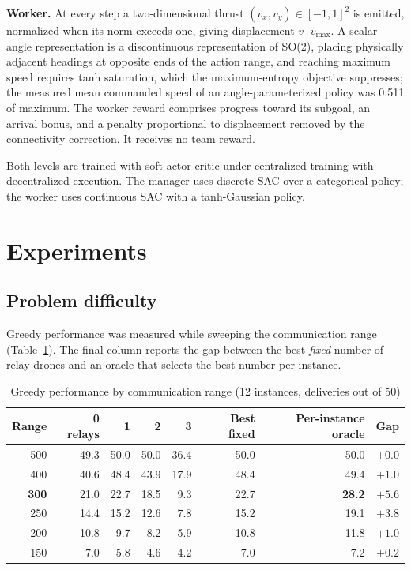 \documentclass[12pt]{article}
\begin{document}
\textbf{Worker.} At every step a two-dimensional thrust $(v_x, v_y) \in [-1,1]^2$ is emitted,
normalized when its norm exceeds one, giving displacement $v \cdot v_{\max}$. A scalar-angle
representation is a discontinuous representation of SO(2), placing physically adjacent headings at
opposite ends of the action range, and reaching maximum speed requires tanh saturation, which the
maximum-entropy objective suppresses; the measured mean commanded speed of an angle-parameterized
policy was 0.511 of maximum. The worker reward comprises progress toward its subgoal, an arrival
bonus, and a penalty proportional to displacement removed by the connectivity correction. It
receives no team reward.

Both levels are trained with soft actor-critic under centralized training with decentralized
execution. The manager uses discrete SAC over a categorical policy; the worker uses continuous SAC
with a tanh-Gaussian policy.

\section{Experiments}

\subsection{Problem difficulty}

Greedy performance was measured while sweeping the communication range (Table~\ref{tab:sweep}).
The final column reports the gap between the best \emph{fixed} number of relay drones and an
oracle that selects the best number per instance.

\begin{table}[h]
\centering
\caption{Greedy performance by communication range (12 instances, deliveries out of 50)}
\label{tab:sweep}
\begin{tabular}{rrrrrrrr}
\toprule
Range & 0 relays & 1 & 2 & 3 & Best fixed & Per-instance oracle & Gap \\
\midrule
500 & 49.3 & 50.0 & 50.0 & 36.4 & 50.0 & 50.0 & $+0.0$ \\
400 & 40.6 & 48.4 & 43.9 & 17.9 & 48.4 & 49.4 & $+1.0$ \\
\textbf{300} & 21.0 & 22.7 & 18.5 & 9.3 & 22.7 & \textbf{28.2} & $\mathbf{+5.6}$ \\
250 & 14.4 & 15.2 & 12.6 & 7.8 & 15.2 & 19.1 & $+3.8$ \\
200 & 10.8 & 9.7 & 8.2 & 5.9 & 10.8 & 11.8 & $+1.0$ \\
150 & 7.0 & 5.8 & 4.6 & 4.2 & 7.0 & 7.2 & $+0.2$ \\
\bottomrule
\end{tabular}
\end{table}
\end{document}
